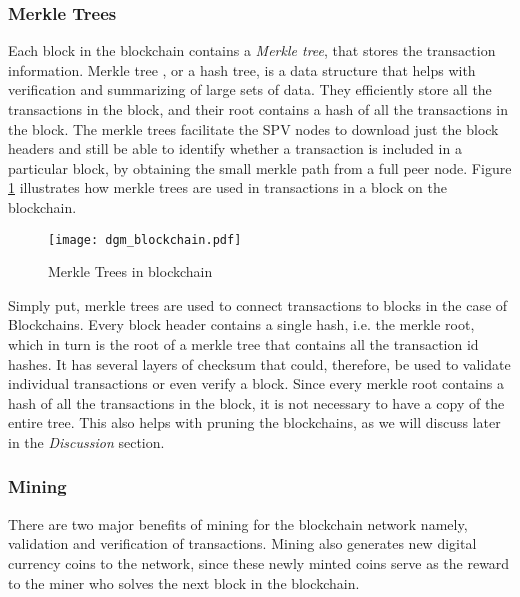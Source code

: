 \documentclass[english]{tktltiki}
\begin{document}
\subsubsection{Merkle Trees}

Each block in the blockchain contains a \textit{Merkle tree}, that stores the transaction information. Merkle tree \cite{bitcoinbook}, or a hash tree, is a data structure that helps with verification and summarizing of large sets of data. They efficiently store all the transactions in the block, and their root contains a hash of all the transactions in the block. The merkle trees facilitate the SPV nodes to download just the block headers and still be able to identify whether a transaction is included in a particular block, by obtaining the small merkle path from a full peer node. Figure \ref{merkle-tree} illustrates how merkle trees are used in transactions in a block on the blockchain.

\begin{figure}[H]
\begin{center}
\texttt{[image: dgm\_blockchain.pdf]}
\caption{Merkle Trees in blockchain}
\label{merkle-tree}
\end{center}
\end{figure}

Simply put, merkle trees are used to connect transactions to blocks in the case of Blockchains. Every block header contains a single hash, i.e. the merkle root, which in turn is the root of a merkle tree that contains all the transaction id hashes. It has several layers of checksum that could, therefore, be used to validate individual transactions or even verify a block. Since every merkle root contains a hash of all the transactions in the block, it is not necessary to have a copy of the entire tree. This also helps with pruning the blockchains, as we will discuss later in the \textit{Discussion} section.

\subsubsection{Mining}

There are two major benefits of mining for the blockchain network namely, validation and verification of transactions. Mining also generates new digital currency coins to the network, since these newly minted coins serve as the reward to the miner who solves the next block in the blockchain. 
\end{document}
